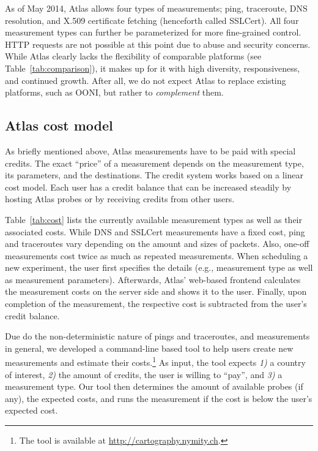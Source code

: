 As of May 2014, Atlas allows four types of measurements; ping, traceroute, DNS
resolution, and X.509 certificate fetching (henceforth called SSLCert).  All
four measurement types can further be parameterized for more fine-grained
control.  HTTP requests are not possible at this point due to abuse and
security concerns.  While Atlas clearly lacks the flexibility of comparable
platforms (see Table~\ref{tab:comparison}), it makes up for it with high
diversity, responsiveness, and continued growth.  After all, we do not expect
Atlas to replace existing platforms, such as OONI, but rather to
\emph{complement} them.


\subsection{Atlas cost model}

As briefly mentioned above, Atlas measurements have to be paid with special
credits.  The exact ``price'' of a measurement depends on the measurement type,
its parameters, and the destinations.  The credit system works based on a
linear cost model.  Each user has a credit balance that can be increased
steadily by hosting Atlas probes or by receiving credits from other users.

Table~\ref{tab:cost} lists the currently available measurement types as well as
their associated costs.  While DNS and SSLCert measurements have a fixed cost,
ping and traceroutes vary depending on the amount and sizes of packets.  Also,
one-off measurements cost twice as much as repeated measurements.  When
scheduling a new experiment, the user first specifies the details (e.g.,
measurement type as well as measurement parameters).  Afterwards, Atlas'
web-based frontend calculates the measurement costs on the server side and
shows it to the user.  Finally, upon completion of the measurement, the
respective cost is subtracted from the user's credit balance.

Due do the non-deterministic nature of pings and traceroutes, and measurements
in general, we developed a command-line based tool to help users create new
measurements and estimate their costs.\footnote{The tool is available at
\url{http://cartography.nymity.ch}.}  As input, the tool expects \emph{1)}
a country of interest, \emph{2)} the amount of credits, the user is willing
to ``pay'', and \emph{3)} a measurement type.  Our tool then determines the
amount of available probes (if any), the expected costs, and runs the
measurement if the cost is below the user's expected cost.

